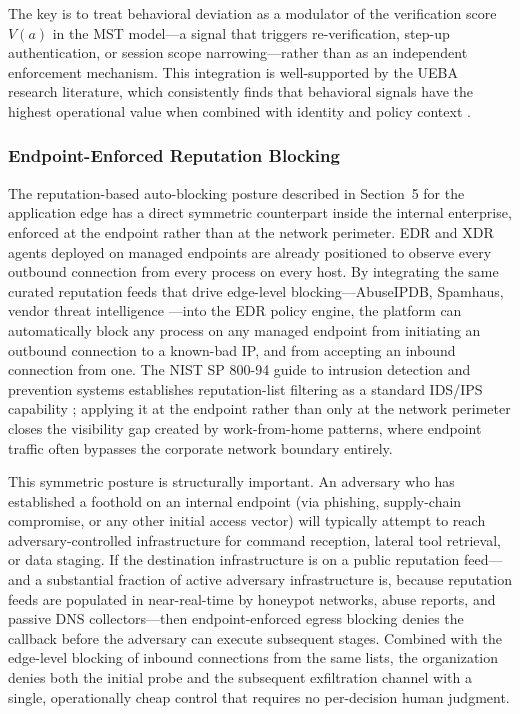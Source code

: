 \documentclass[acmlarge]{acmart}
\begin{document}
The key is to treat behavioral deviation as a modulator of the verification score $V(a)$
in the MST model---a signal that triggers re-verification, step-up authentication, or
session scope narrowing---rather than as an independent enforcement mechanism. This
integration is well-supported by the UEBA research literature, which consistently finds
that behavioral signals have the highest operational value when combined with
identity and policy context \cite{tuor2017}.

\subsubsection{Endpoint-Enforced Reputation Blocking}

The reputation-based auto-blocking posture described in Section~5 for the application
edge has a direct symmetric counterpart inside the internal enterprise, enforced at the
endpoint rather than at the network perimeter. EDR and XDR agents deployed on managed
endpoints are already positioned to observe every outbound connection from every
process on every host. By integrating the same curated reputation feeds that drive
edge-level blocking---AbuseIPDB, Spamhaus, vendor threat intelligence
\cite{abuseipdb2024,spamhaus2024}---into the EDR policy engine, the platform can
automatically block any process on any managed endpoint from initiating an outbound
connection to a known-bad IP, and from accepting an inbound connection from one.
The NIST SP 800-94 guide to intrusion detection and prevention systems establishes
reputation-list filtering as a standard IDS/IPS capability \cite{scarfone2007};
applying it at the endpoint rather than only at the network perimeter closes the
visibility gap created by work-from-home patterns, where endpoint traffic often
bypasses the corporate network boundary entirely.

This symmetric posture is structurally important. An adversary who has established
a foothold on an internal endpoint (via phishing, supply-chain compromise, or any
other initial access vector) will typically attempt to reach adversary-controlled
infrastructure for command reception, lateral tool retrieval, or data staging. If
the destination infrastructure is on a public reputation feed---and a substantial
fraction of active adversary infrastructure is, because reputation feeds are
populated in near-real-time by honeypot networks, abuse reports, and passive DNS
collectors---then endpoint-enforced egress blocking denies the callback before
the adversary can execute subsequent stages. Combined with the edge-level blocking
of inbound connections from the same lists, the organization denies both the
initial probe and the subsequent exfiltration channel with a single, operationally
cheap control that requires no per-decision human judgment.
\end{document}
